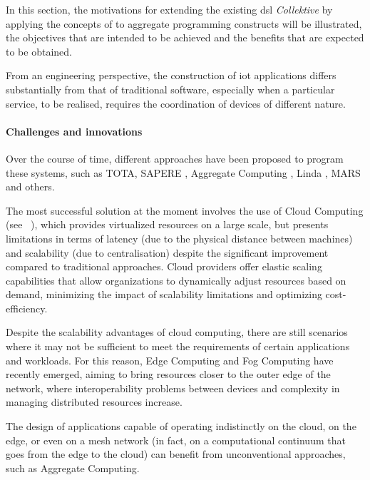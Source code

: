 In this section, the motivations for extending the existing \ac{dsl} \emph{Collektive} by applying the concepts of \xc{}
to aggregate programming constructs will be illustrated, the objectives that are intended to be achieved and the benefits
that are expected to be obtained.

From an engineering perspective, the construction of \ac{iot} applications differs substantially from that of traditional
software, especially when a particular service, to be realised, requires the coordination of devices of different nature.

\paragraph{Challenges and innovations}
Over the course of time, different approaches have been proposed to program these systems, such as TOTA, SAPERE \cite{ZAMBONELLI2011197},
Aggregate Computing \cite{Beal2016}, Linda \cite{10.1145/2363.2433}, MARS \cite{865084} and others.

The most successful solution at the moment involves the use of Cloud Computing (see ~),
which provides virtualized resources on a large scale, but presents limitations in terms of latency (due to the physical
distance between machines) and scalability (due to centralisation) despite the significant improvement compared to traditional
approaches.
Cloud providers offer elastic scaling capabilities that allow organizations to dynamically adjust resources based on demand,
minimizing the impact of scalability limitations and optimizing cost-efficiency.

Despite the scalability advantages of cloud computing, there are still scenarios where it may not be sufficient to meet
the requirements of certain applications and workloads.
For this reason, Edge Computing and Fog Computing have recently emerged, aiming to bring resources closer to the outer
edge of the network, where interoperability problems between devices and complexity in managing distributed resources increase.

The design of applications capable of operating indistinctly on the cloud, on the edge, or even on a mesh network
(in fact, on a computational continuum that goes from the edge to the cloud) can benefit from unconventional approaches,
such as Aggregate Computing.

